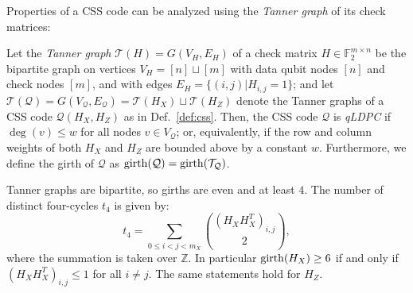 Properties of a CSS code can be analyzed using the \emph{Tanner graph} of its check matrices:
\begin{definition}\label{def:qldpc}
Let the \emph{Tanner graph} $\mathcal{T}(H) = G(V_H, E_H)$ of a check matrix $H\in \mathbb F_2^{m\times n}$ be the bipartite graph on vertices $V_H = [n]\sqcup[m]$ with data qubit nodes $[n]$ and check nodes $[m]$, and with edges $E_H = \{(i,j)|H_{i,j} = 1\}$; and let $\mathcal{T}(\mathcal{Q}) =G(V_\mathcal{Q}, E_\mathcal{Q}) =  \mathcal{T}(H_X)\sqcup\mathcal{T}(H_Z)$ denote the Tanner graphs of a CSS code $\mathcal{Q}(H_X,H_Z)$ as in Def.~\ref{def:css}. Then, the CSS code $\mathcal{Q}$ is \emph{qLDPC} if $\deg(v)\leq w$ for all nodes $v\in V_\mathcal{Q}$; or, equivalently, if the row and column weights of both $H_X$ and $H_Z$ are bounded above by a constant $w$. Furthermore, we define the girth of $\mathcal{Q}$ as $\mathrm{girth}(\mathcal Q) = \mathrm{girth}(\mathcal{T}_\mathcal{Q})$.
\end{definition}
\begin{lemma}\label{lemma:girth}
Tanner graphs are bipartite, so girths are even and at least $4$. The number of distinct four-cycles $t_4$ is given by:
\begin{equation}\label{eq:four-cycle-count}
    t_4 = \sum_{0\leq i< j< m_X} \binom{(H_XH_X^T)_{i,j}}{2},
\end{equation}
where the summation is taken over $\mathbb Z$. In particular $\mathrm{girth}(H_X)\geq 6$ if and only if $(H_XH_X^T)_{i,j}\leq 1$ for all $i\neq j$. The same statements hold for $H_Z$.
\end{lemma}
